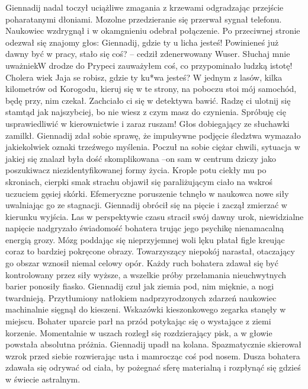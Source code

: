 \documentclass[../MAIN.tex]{subfiles}
\begin{document}
Giennadij nadal toczył uciążliwe zmagania z krzewami odgradzając przejście poharatanymi dłoniami. Mozolne przedzieranie się przerwał sygnał telefonu. Naukowiec wzdrygnął i w okamgnieniu odebrał połączenie. Po przeciwnej stronie odezwał się znajomy głos: 
% 
\sx Giennadij, gdzie ty u licha jesteś! Powinieneś już dawny być w pracy, stało się coś? -- cedził zdenerwowany Wuser. 
\xx Słuchaj mnie uważnie\3kW drodze do Prypeci zauważyłem coś, co przypominało ludzką istotę! Cholera wie\3k 
\xx Jaja se robisz, gdzie ty ku*wa jesteś? 
\xx W jednym z lasów, kilka kilometrów od Korogodu, kieruj się w te strony, na poboczu stoi mój samochód, będę przy, nim czekał. 
\xx Zachciało ci się w detektywa bawić. Radzę ci ulotnij się stamtąd jak najszybciej, bo nie wiesz z czym masz do czynienia. Spróbuję cię usprawiedliwić w kierownictwie i zaraz ruszam! 
\qd
Głos dobiegający ze słuchawki zamilkł. Giennadij zdał sobie sprawę, że impulsywne podjęcie śledztwa wymazało jakiekolwiek oznaki trzeźwego myślenia. Poczuł na sobie ciężar chwili, sytuacja w jakiej się znalazł była dość skomplikowana --on sam w centrum dziczy jako poszukiwacz niezidentyfikowanej formy życia. Krople potu ciekły mu po skroniach, cierpki smak strachu objawił się paraliżującym ciało na wskroś uczuciem gęsiej skórki. Efemeryczne poruszenie tchnęło w naukowca nowe siły uwalniając go ze stagnacji. Giennadij obrócił się na pięcie i zaczął zmierzać w kierunku wyjścia. Las w perspektywie czasu stracił swój dawny urok, niewidzialne napięcie nadgryzało świadomość bohatera trując jego psychikę nienamacalną energią grozy. Mózg poddając się nieprzyjemnej woli lęku płatał figle kreując coraz to bardziej pokręcone obrazy. Towarzyszący niepokój narastał, otaczający go obszar wznosił niemal celowy opór. Każdy ruch bohatera zdawał się być kontrolowany przez siły wyższe, a wszelkie próby przełamania 
nieuchwytnych barier ponosiły fiasko. Giennadij czuł jak ziemia pod, nim mięknie, a nogi twardnieją. Przytłumiony natłokiem nadprzyrodzonych zdarzeń naukowiec machinalnie sięgnął do kieszeni. Wskazówki kieszonkowego zegarka stanęły w miejscu. Bohater uparcie parł na przód potykając się o wystające z ziemi korzenie. Momentalnie w uszach rozległ się rozdzierający pisk, a w głowie powstała absolutna próżnia. Giennadij upadł na kolana. Spazmatycznie skierował wzrok przed siebie rozwierając usta i mamrocząc coś pod nosem. Dusza bohatera zdawała się odrywać od ciała, by pożegnać sferę materialną i rozpłynąć się gdzieś w świecie astralnym. 
\end{document}
